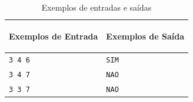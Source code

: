 \begin{table}[h]
    \centering
    \begin{tabular}{|p{7cm}|p{7cm}|}
        \hline
        \begin{center}
            \vspace{-0.3cm}
            \textbf{Exemplos de Entrada}
            \vspace{-0.3cm}
        \end{center} 
         &  
        \begin{center}
            \vspace{-0.3cm}
            \textbf{Exemplos de Saída}
            \vspace{-0.3cm}
        \end{center} \\ \hline
        \texttt{3 4 6} & \texttt{SIM} \\ \hline
        \texttt{3 4 7} & \texttt{NAO} \\ \hline
        \texttt{3 3 7} & \texttt{NAO} \\ \hline
    \end{tabular}
    \caption{Exemplos de entradas e saídas}
    
\end{table}

\newpage

\begin{center}
\noindent

\end{center}